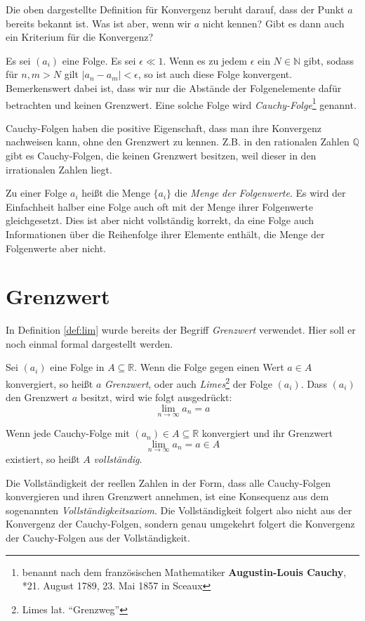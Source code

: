 Die oben dargestellte Definition für Konvergenz beruht darauf, dass der Punkt $a$ bereits bekannt ist. Was ist aber, wenn wir $a$ nicht kennen? Gibt es dann auch ein Kriterium für die Konvergenz?

\begin{definition}
Es sei $(a_i)$ eine Folge. Es sei $\epsilon \ll 1$. Wenn es zu jedem $\epsilon$ ein $N\in \mathbb{N}$ gibt, sodass für $n,m > N$ gilt $\vert a_n -a_m \vert <\epsilon$, so ist auch diese Folge konvergent. Bemerkenswert dabei ist, dass wir nur die Abstände der Folgenelemente dafür betrachten und keinen Grenzwert. Eine solche Folge wird \textsl{Cauchy-Folge}\footnote{benannt nach dem französischen Mathematiker \textbf{Augustin-Louis Cauchy}, *21. August 1789, 23. Mai 1857 in Sceaux} genannt.
\end{definition}

Cauchy-Folgen haben die positive Eigenschaft, dass man ihre Konvergenz nachweisen kann, ohne den Grenzwert zu kennen. Z.B. in den rationalen Zahlen $\mathbb{Q}$ gibt es Cauchy-Folgen, die keinen Grenzwert besitzen, weil dieser in den irrationalen Zahlen liegt.


\begin{definition}
Zu einer Folge $a_i$ heißt die Menge $\lbrace a_i \rbrace$ die \textsl{Menge der Folgenwerte}. Es wird der Einfachheit halber eine Folge auch oft mit der Menge ihrer Folgenwerte gleichgesetzt. Dies ist aber nicht vollständig korrekt, da eine Folge auch Informationen über die Reihenfolge ihrer Elemente enthält, die Menge der Folgenwerte aber nicht. 
\end{definition}

\section{Grenzwert}

In Definition \ref{def:lim} wurde bereits der Begriff \textsl{Grenzwert} verwendet. Hier soll er noch einmal formal dargestellt werden. 

\begin{definition}
Sei $(a_i)$ eine Folge in $A\subseteq \mathbb{R}$. Wenn die Folge gegen einen Wert $a\in A$ konvergiert, so heißt $a$ \textsl{Grenzwert}, oder auch \textsl{Limes}\footnote{Limes lat. "`Grenzweg"'} der Folge $(a_i)$. Dass $(a_i)$ den Grenzwert $a$ besitzt, wird wie folgt ausgedrückt:
\[
\lim_{n\rightarrow \infty} a_n = a
\]
\end{definition}

\begin{definition}\label{def:voll}
Wenn jede Cauchy-Folge mit $(a_n)\in A\subseteq \mathbb{R}$ konvergiert und ihr Grenzwert 
\[\lim_{n\rightarrow \infty} a_n = a\in A\] 
existiert, so heißt $A$ \textsl{vollständig}. 

Die Vollständigkeit der reellen Zahlen in der Form, dass alle Cauchy-Folgen konvergieren und ihren Grenzwert annehmen, ist eine Konsequenz aus dem sogenannten \textsl{Vollständigkeitsaxiom}. Die Vollständigkeit folgert also nicht aus der Konvergenz der Cauchy-Folgen, sondern genau umgekehrt folgert die Konvergenz der Cauchy-Folgen aus der Vollständigkeit. 
\end{definition}


